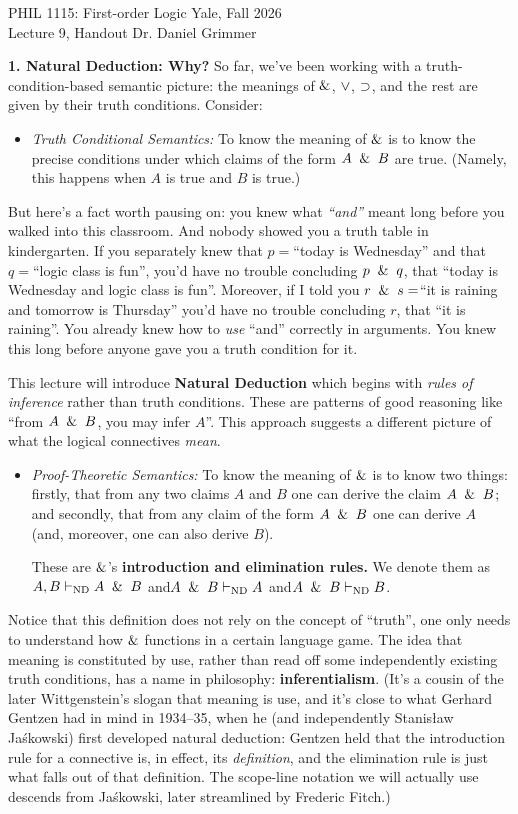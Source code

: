 \documentclass[options]{philosophersimprint}
\begin{document}
PHIL 1115: First-order Logic \hfill Yale, Fall 2026\\
Lecture 9, Handout \hfill Dr. Daniel Grimmer

\textbf{1. Natural Deduction: Why?} So far, we've been working with a truth-condition-based semantic picture: the meanings of $\mathbin{\&}$, $\mathbin{\vee}$, $\mathbin{\supset}$, and the rest are given by their truth conditions. Consider:
\begin{itemize}
    \item \textit{Truth Conditional Semantics:} To know the meaning of $\mathbin{\&}$ is to know the precise conditions under which claims of the form $A \ \mathbin{\&} \  B$ are true. (Namely, this happens when $A$ is true and $B$ is true.)
\end{itemize}
But here's a fact worth pausing on: you knew what \textit{``and''} meant long before you walked into this classroom. And nobody showed you a truth table in kindergarten. If you separately knew that $p=$``today is Wednesday'' and that $q=$``logic class is fun'', you'd have no trouble concluding $p \ \mathbin{\&} \  q$, that ``today is Wednesday and logic class is fun''. Moreover, if I told you $r \ \mathbin{\&} \  s =$``it is raining and tomorrow is Thursday'' you'd have no trouble concluding $r$, that ``it is raining''. You already knew how to \textit{use} ``and'' correctly in arguments. You knew this long before anyone gave you a truth condition for it.

This lecture will introduce \textbf{Natural Deduction} which begins with \textit{rules of inference} rather than truth conditions. These are patterns of good reasoning like ``from $A \ \mathbin{\&} \  B$, you may infer $A$''. This approach suggests a different picture of what the logical connectives \textit{mean}.
\begin{itemize}
    \item \textit{Proof-Theoretic Semantics:} To know the meaning of $\mathbin{\&}$ is to know two things: firstly, that from any two claims $A$ and $B$ one can derive the claim $A \ \mathbin{\&} \  B$; and secondly, that from any claim of the form $A \ \mathbin{\&} \  B$ one can derive $A$ (and, moreover, one can also derive $B$).

    These are $\mathbin{\&}$'s \textbf{introduction and elimination rules.} We denote them as $A,B \vdash_{\mathrm{ND}} A \ \mathbin{\&} \  B$ \quad and\quad $A \ \mathbin{\&} \  B\vdash_{\mathrm{ND}} A$ \quad and\quad $A \ \mathbin{\&} \  B\vdash_{\mathrm{ND}} B$.
\end{itemize}
Notice that this definition does not rely on the concept of ``truth'', one only needs to understand how $\mathbin{\&}$ functions in a certain language game. The idea that meaning is constituted by use, rather than read off some independently existing truth conditions, has a name in philosophy: \textbf{inferentialism}. (It's a cousin of the later Wittgenstein's slogan that meaning is use, and it's close to what Gerhard Gentzen had in mind in 1934--35, when he (and independently Stanis\l aw Ja\'skowski) first developed natural deduction: Gentzen held that the introduction rule for a connective is, in effect, its \textit{definition}, and the elimination rule is just what falls out of that definition. The scope-line notation we will actually use descends from Ja\'skowski, later streamlined by Frederic Fitch.)
\end{document}

